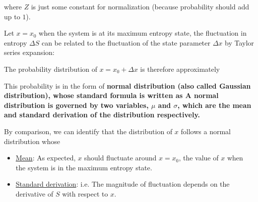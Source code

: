 \documentclass[class=article, crop=false, 12pt]{standalone}
\begin{document}
where $Z$ is just some constant for normalization (because probability should add up to $1$).

Let $x=x_0$ when the system is at its maximum entropy state,
the fluctuation in entropy $\Delta S$ can be related to 
the fluctuation of the state parameter $\Delta x$ by Taylor series expansion:

The probability distribution of $x=x_0+\Delta x$ is therefore approximately

This probability is in the form of \bf{normal distribution} (also called Gaussian distribution),
whose standard formula is written as
A normal distribution is governed by two variables, $\mu$ and $\sigma$, 
which are the mean and standard derivation of the distribution respectively.


By comparison, we can identify that the distribution of $x$ follows a normal distribution whose
\begin{itemize}
    \item \ul{Mean}: 
    As expected, $x$ should fluctuate around $x=x_0$,
    the value of $x$ when the system is in the maximum entropy state.
    
    \item \ul{Standard derivation}:
    i.e. The magnitude of fluctuation depends on the  derivative of $S$ with respect to $x$.

\end{itemize}
\end{document}
